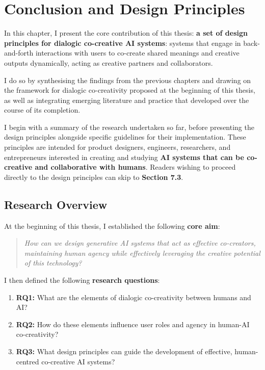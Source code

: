 \chapter[Conclusion]{Conclusion and Design Principles}\label{c:conclusion}

In this chapter, I present the core contribution of this thesis: \textbf{a set of design principles for dialogic co-creative AI systems}: systems that engage in back-and-forth interactions with users to co-create shared meanings and creative outputs dynamically, acting as creative partners and collaborators.

I do so by synthesising the findings from the previous chapters and drawing on the framework for dialogic co-creativity proposed at the beginning of this thesis, as well as integrating emerging literature and practice that developed over the course of its completion.

I begin with a summary of the research undertaken so far, before presenting the design principles alongside specific guidelines for their implementation. These principles are intended for product designers, engineers, researchers, and entrepreneurs interested in creating and studying \textbf{AI systems that can be co-creative and collaborative with humans}. Readers wishing to proceed directly to the design principles can skip to \textbf{Section 7.3}.


\section{Research Overview}

At the beginning of this thesis, I established the following \textbf{core aim}:

\begin{quote}
\emph{How can we design generative AI systems that act as effective co-creators, maintaining human agency while effectively leveraging the creative potential of this technology?}
\end{quote}

I then defined the following \textbf{research questions}:

\begin{enumerate}
    \item \textbf{RQ1:} What are the elements of dialogic co-creativity between humans and AI?
    \item \textbf{RQ2:} How do these elements influence user roles and agency in human-AI co-creativity?
    \item \textbf{RQ3:} What design principles can guide the development of effective, human-centred co-creative AI systems?
\end{enumerate}


